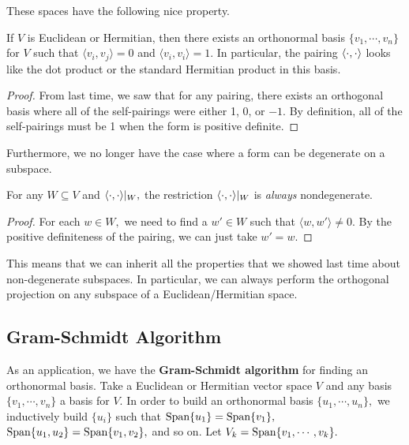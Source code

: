 These spaces have the following nice property.
\begin{theorem}
If $V$ is Euclidean or Hermitian, then there exists an orthonormal basis $\{v_1, \cdots, v_n \}$ for $V$ such that $\langle v_i, v_j \rangle = 0$ and $\langle v_i, v_i \rangle = 1$. In particular, the pairing $\langle \cdot, \cdot \rangle$ looks like the dot product or the standard Hermitian product in this basis. 
\end{theorem} 
\begin{proof}
    From last time, we saw that for any pairing, there exists an orthogonal basis where all of the self-pairings were either 1, 0, or $-1.$
    By definition, all of the self-pairings must be 1 when the form is positive definite.
\end{proof}
Furthermore, we no longer have the case where a form can be degenerate on a subspace. 
\begin{claim}
    For any $W \subseteq V$ and $\langle \cdot, \cdot \rangle|_W,$ the restriction $\langle \cdot, \cdot \rangle|_W$ is \emph{always} nondegenerate. 
\end{claim}
\begin{proof}
For each $w \in W,$ we need to find a $w' \in W$ such that $\langle w, w'\rangle \neq 0$. By the positive definiteness of the pairing, we can just take $w' = w.$ 
\end{proof}
This means that we can inherit all the properties that we showed last time about non-degenerate subspaces. 
In particular, we can always perform the orthogonal projection on any subspace of a Euclidean/Hermitian space.

\subsection{Gram-Schmidt Algorithm}
As an application, we have the \textbf{Gram-Schmidt algorithm} for finding an orthonormal basis. 
Take a Euclidean or Hermitian vector space $V$ and any basis $\{v_1, \cdots, v_n\}$ a basis for $V.$ In order to build an orthonormal basis $\{u_1, \cdots, u_n\},$ we inductively build $\{u_i\}$ such that $\text{Span}\{u_1\} = \text{Span}\{v_1\},$ $\text{Span}\{u_1, u_2\} = \text{Span}\{v_1, v_2\},$ and so on. Let $V_k = \text{Span}\{v_1, \cdots, v_k\}.$

